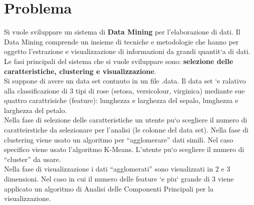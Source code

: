 \documentclass[a4paper, oneside]{book}
\begin{document}
\section*{Problema}
Si vuole sviluppare un sistema di \textbf{Data Mining} per l'elaborazione di dati. Il Data Mining comprende un insieme di tecniche e metodologie che hanno per oggetto l'estrazione e visualizzazione di informazioni da grandi quantit`a di dati. Le fasi principali del sistema che si vuole sviluppare sono: \textbf{selezione delle caratteristiche, clustering e visualizzazione}.\\
Si suppone di avere un data set contnuto in un file .data. Il data set `e ralativo alla classificazione di 3 tipi di rose (setosa, versicolour, virginica) mediante sue quattro carattrisiche (feature): lunghezza e larghezza del sepalo, lunghezza e larghezza del petalo.\\
Nella fase di selezione delle caratteristiche un utente pu`o scegliere il numero di caratteirstiche da selezionare per l'analisi (le colonne del data set).
Nella fase di clustering viene usato un algoritmo per “agglomerare” dati simili. Nel caso specifico viene usato l'algoritmo K-Means. L'utente pu`o scegliere il numero di “cluster” da usare.\\
Nella fase di visualizzazione i dati “agglomerati” sono visualizzati in 2 e 3 dimensioni. Nel caso in cui il numero delle feature `e piu` grande di 3 viene applicato un algoritmo di Analisi delle Componenti Principali per la visualizzazione.
\\
\large
\newpage
\end{document}
